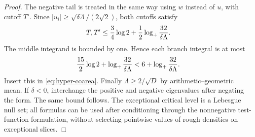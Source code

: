 \documentclass[11pt]{article}
\numberwithin{equation}{section}
\theoremstyle{definition}\newtheorem{definition}[theorem]{Definition}
\theoremstyle{remark}\newtheorem{remark}[theorem]{Remark}
\newcommand{\1}{\mathbf 1}\newcommand{\diag}{\operatorname{diag}}
\begin{document}
\begin{proof}
The negative tail is treated in the same way using $w$ instead of $u$, with cutoff $T'$. Since $|u_i|\ge\sqrt{\delta\Lambda}/(2\sqrt2)$, both cutoffs satisfy
\[
 T,T'\le\frac34\log2+\frac12\log_+\frac{32}{\delta\Lambda}.
\]
The middle integrand is bounded by one. Hence each branch integral is at most
\[
 \frac{15}{2}\log2+\log_+\frac{32}{\delta\Lambda}
 <6+\log_+\frac{32}{\delta\Lambda}.
\]
Insert this in \eqref{eq:hyper-coarea}. Finally $\Lambda\ge2/\sqrt D$ by arithmetic--geometric mean. If $\delta<0$, interchange the positive and negative eigenvalues after negating the form. The same bound follows. The exceptional critical level is a Lebesgue null set; all formulas can be used after conditioning through the nonnegative test-function formulation, without selecting pointwise values of rough densities on exceptional slices.
\end{proof}
\end{document}
